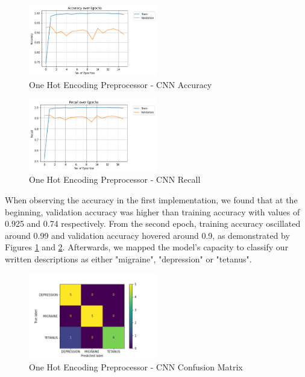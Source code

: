 \documentclass[12pt]{report}
\begin{document}
\begin{figure}[H]
	\centering
	\includegraphics[width=0.5\textwidth]{accuracy.png}
	\caption{One Hot Encoding Preprocessor - CNN Accuracy}
	\label{fig:ohep-acc}
\end{figure}

\begin{figure}[H]
	\centering
	\includegraphics[width=0.5\textwidth]{recall.png}
	\caption{One Hot Encoding Preprocessor - CNN Recall}
	\label{fig:ohep-rec}
\end{figure}

When observing the accuracy in the first implementation,
we found that at the beginning, validation accuracy was higher than training
accuracy with values of 0.925 and 0.74 respectively. From the second epoch,
training accuracy oscillated around 0.99 and validation accuracy hovered around
0.9, as demonstrated by Figures \ref{fig:ohep-acc} and \ref{fig:ohep-rec}.
Afterwards, we mapped the
model's capacity to classify our written descriptions as either "migraine", "depression" or "tetanus".

\begin{figure}[H]
	\centering
	\includegraphics[width=0.5\textwidth]{confusion_matrix_ohe.png}
	\caption{One Hot Encoding Preprocessor - CNN Confusion Matrix}
	\label{fig:ohep-con}
\end{figure}
\end{document}
